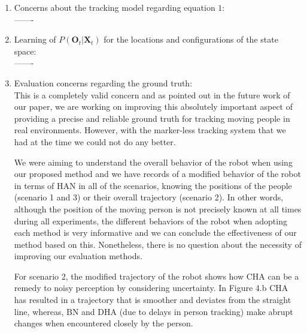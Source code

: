 \documentclass[a4paper]{article}
\begin{document}
\begin{enumerate}
  \item Concerns about the tracking model regarding equation $1$:\\-------
  
  
  \item Learning of $P(\textbf{O}_{t} | \textbf{X}_{t})$ for the locations and configurations of the state space:\\-------
  
  
  
  
  \item Evaluation concerns regarding the ground truth:
  \\This is a completely valid concern and as pointed out in the future work of our paper, we are working on improving this absolutely important aspect of providing a precise and reliable ground truth for tracking moving people in real environments. However, with the marker-less tracking system that we had at the time we could not do any better. %
  
  We were aiming to understand the overall behavior of the robot when using our proposed method and we have records of a modified behavior of the robot in terms of HAN in all of the scenarios, knowing the positions of the people (scenario 1 and 3) or their overall trajectory (scenario 2). In other words, although the position of the moving person is not precisely known at all times during all experiments, the different behaviors of the robot when adopting each method is very informative and we can conclude the effectiveness of our method based on this. Nonetheless, there is no question about the necessity of improving our evaluation methods.
  
  
  For scenario 2, the modified trajectory of the robot shows how CHA can be a remedy to noisy perception by considering uncertainty. In Figure 4.b CHA has resulted in a trajectory that is smoother and deviates from the straight line, whereas, BN and DHA (due to delays in person tracking) make abrupt changes when encountered closely by the person. 
  
  
 
  

\end{enumerate}
\end{document}
